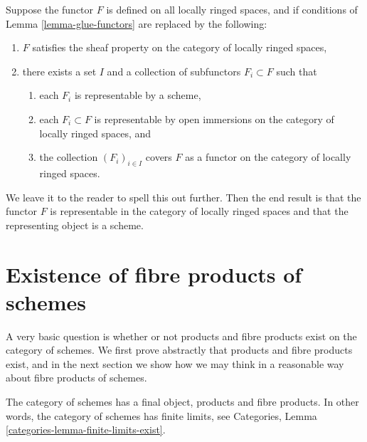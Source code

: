 \begin{remark}
\label{remark-representable-locally-ringed}
Suppose the functor $F$ is defined on all locally ringed spaces,
and if conditions of Lemma \ref{lemma-glue-functors} are replaced by
the following:
\begin{enumerate}
\item $F$ satisfies the sheaf property on the category of locally ringed
spaces,
\item there exists a set $I$ and a collection of subfunctors
$F_i \subset F$ such that
\begin{enumerate}
\item each $F_i$ is representable by a scheme,
\item each $F_i \subset F$ is representable by open immersions
on the category of locally ringed spaces, and
\item the collection $(F_i)_{i \in I}$ covers $F$
as a functor on the category of locally ringed spaces.
\end{enumerate}
\end{enumerate}
We leave it to the reader to spell this out further.
Then the end result is that the functor $F$ is
representable in the category of locally ringed spaces
and that the representing object is a scheme.
\end{remark}



\section{Existence of fibre products of schemes}
\label{section-existence-fibre-products}

\noindent
A very basic question is whether or not products and fibre products
exist on the category of schemes. We first prove abstractly that
products and fibre products exist, and in the next section
we show how we may think in a reasonable way about fibre
products of schemes.

\begin{lemma}
\label{lemma-fibre-products}
The category of schemes has a final object, products and fibre products.
In other words, the category of schemes has finite limits, see
Categories, Lemma \ref{categories-lemma-finite-limits-exist}.
\end{lemma}

